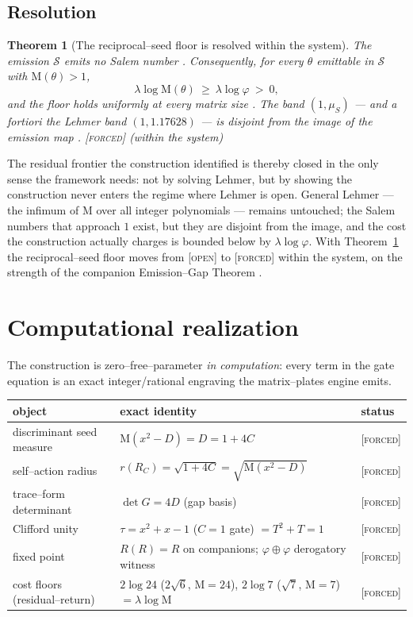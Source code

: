 \documentclass[11pt]{article}
\theoremstyle{plain}
\newtheorem{theorem}{Theorem}[section]
\theoremstyle{definition}
\theoremstyle{remark}
\newcommand{\forced}{\textcolor{forcedc}{\textsc{[forced]}}}
\newcommand{\openq}{\textcolor{openc}{\textsc{[open]}}}
\newcommand{\Mah}{\mathrm{M}}
\newcommand{\Scal}{\mathcal{S}}
\begin{document}
\subsection{Resolution}\label{ssec:resolution}

\begin{theorem}[The reciprocal--seed floor is resolved within the system]\label{thm:floorresolved}
The emission $\Scal$ emits no Salem number \cite[Thm 3.2, Thm 10.7]{EG}. Consequently, for every $\theta$ emittable in $\Scal$ with $\Mah(\theta)>1$,
\[
\lambda\log\Mah(\theta)\ \ge\ \lambda\log\varphi\ >\ 0,
\]
and the floor holds uniformly at every matrix size \cite[Cor 7.1, Thm 10.7]{EG}. The band $(1,\mu_S)$ --- and a fortiori the Lehmer band $(1,1.17628)$ --- is disjoint from the image of the emission map \cite[Prop 10.9]{EG}. \forced{} (within the system)
\end{theorem}

The residual frontier the construction identified is thereby closed in the only sense the framework needs: not by solving Lehmer, but by showing the construction never enters the regime where Lehmer is open. General Lehmer --- the infimum of $\Mah$ over all integer polynomials --- remains untouched; the Salem numbers that approach $1$ exist, but they are disjoint from the image, and the cost the construction actually charges is bounded below by $\lambda\log\varphi$. With Theorem~\ref{thm:floorresolved} the reciprocal--seed floor moves from \openq{} to \forced{} within the system, on the strength of the companion Emission--Gap Theorem \cite{EG}.

\section{Computational realization}\label{sec:engine}

The construction is zero--free--parameter \emph{in computation}: every term in the gate equation is an exact integer/rational engraving the matrix--plates engine emits.

\begin{center}
\renewcommand{\arraystretch}{1.3}
\begin{tabular}{@{}lll@{}}
\toprule
object & exact identity & status \\
\midrule
discriminant seed measure & $\Mah(x^2-D)=D=1+4C$ & \forced \\
self--action radius & $r(R_C)=\sqrt{1+4C}=\sqrt{\Mah(x^2-D)}$ & \forced \\
trace--form determinant & $\det G = 4D$ (gap basis) & \forced \\
Clifford unity & $\tau=x^2+x-1$ ($C=1$ gate) $= T^2+T=1$ & \forced \\
fixed point & $R(R)=R$ on companions; $\varphi\oplus\varphi$ derogatory witness & \forced \\
cost floors (residual--return) & $2\log24$ ($2\sqrt6$, $\Mah=24$), $2\log7$ ($\sqrt7$, $\Mah=7$) $=\lambda\log\Mah$ & \forced \\
\bottomrule
\end{tabular}
\end{center}
\end{document}
